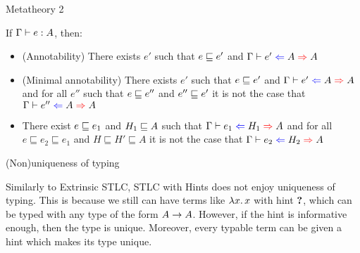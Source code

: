 \documentclass{beamer}
\begin{document}
\begin{frame}{Metatheory 2}

If $\Gamma \vdash e : A$, then:

\begin{itemize}
  \item (Annotability) There exists $e'$ such that $e \sqsubseteq e'$ and $\fullhinting{\Gamma}{e'}{A}{A}$
  \item (Minimal annotability) There exists $e'$ such that $e \sqsubseteq e'$ and $\fullhinting{\Gamma}{e'}{A}{A}$ and for all $e''$ such that $e \sqsubseteq e''$ and $e'' \sqsubseteq e'$ it is not the case that $\fullhinting{\Gamma}{e''}{A}{A}$
  \item There exist $e \sqsubseteq e_1$ and $H_1 \sqsubseteq A$ such that $\fullhinting{\Gamma}{e_1}{H_1}{A}$ and for all $e \sqsubseteq e_2 \sqsubseteq e_1$ and $H \sqsubseteq H' \sqsubseteq A$ it is not the case that $\fullhinting{\Gamma}{e_2}{H_2}{A}$
\end{itemize}

\end{frame}

\begin{frame}{(Non)uniqueness of typing}

Similarly to Extrinsic STLC, STLC with Hints does not enjoy uniqueness of typing. This is because we still can have terms like $\lambda x.\, x$ with hint $\textbf{?}$, which can be typed with any type of the form $A \to A$. However, if the hint is informative enough, then the type is unique. Moreover, every typable term can be given a hint which makes its type unique.

\end{frame}
\end{document}
